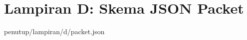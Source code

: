 \chapter{Lampiran D: Skema JSON Packet} \label{lampiran:skema-json-packet}
 {penutup/lampiran/d/packet.json}
